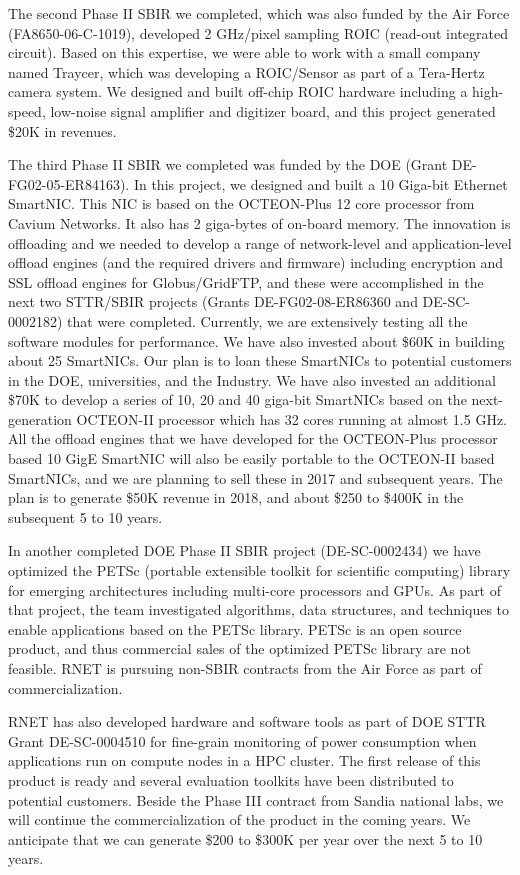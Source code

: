 The second Phase II SBIR we completed, which was also funded by the
Air Force (FA8650-06-C-1019), developed 2 GHz/pixel sampling ROIC
(read-out integrated circuit). Based on this expertise, we were able
to work with a small company named Traycer, which was developing a
ROIC/Sensor as part of a Tera-Hertz camera system. We designed and
built off-chip ROIC hardware including a high-speed, low-noise signal
amplifier and digitizer board, and this project generated \$20K in
revenues. 

The third Phase II SBIR we completed was funded by the DOE (Grant
DE-FG02-05-ER84163). In this project, we designed and built a 10
Giga-bit Ethernet SmartNIC. This NIC is based on the OCTEON-Plus 12
core processor from Cavium Networks. It also has 2 giga-bytes of
on-board memory. The innovation is offloading and we needed to
develop a range of network-level and application-level offload engines
(and the required drivers and firmware) including encryption and SSL
offload engines for Globus/GridFTP, and these were accomplished in the
next two STTR/SBIR projects (Grants DE-FG02-08-ER86360 and
DE-SC-0002182) that were completed. Currently, we are extensively
testing all the software modules for performance. We have also
invested about \$60K in building about 25 SmartNICs. Our plan is to
loan these SmartNICs to potential customers in the DOE,
universities, and the Industry. We have also invested an additional
\$70K to develop a series of 10, 20 and 40 giga-bit SmartNICs based on
the next-generation OCTEON-II processor which has 32 cores running at
almost 1.5 GHz. All the offload engines that we have developed for the
OCTEON-Plus processor based 10 GigE SmartNIC will also be easily
portable to the OCTEON-II based SmartNICs, and we are planning to sell
these in 2017 and subsequent years. The plan is to generate
\$50K revenue in 2018, and about \$250 to \$400K in the subsequent 5 to
10 years.

In another  completed DOE Phase II SBIR project
(DE-SC-0002434) we have optimized the PETSc (portable extensible
toolkit for scientific computing) library for emerging architectures
including multi-core processors and GPUs. As part of that project, the
team investigated algorithms, data structures, and techniques to
enable applications based on the PETSc library. PETSc is an open
source product, and thus commercial sales of the optimized PETSc
library are not feasible.  RNET is  pursuing non-SBIR contracts
from the Air Force as part of commercialization.

RNET has also developed hardware and software tools as part of DOE
STTR Grant DE-SC-0004510 for fine-grain monitoring of power
consumption when applications run on compute nodes in a HPC
cluster. The first release of this product is ready and several evaluation
toolkits have been distributed to potential customers. Beside the Phase III contract from Sandia 
national labs, we will continue the commercialization of the product in the coming years. We
anticipate that we can generate \$200 to \$300K per year over the next  5 to 10 years.

